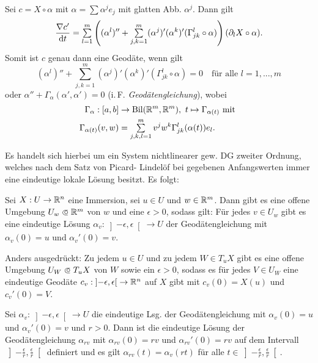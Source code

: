 \documentclass{cheat-sheet}
\newcommand{\Bil}{\mathrm{Bil}}
\newcommand{\ointervall}[1]{\left]#1\right[} %
\begin{document}
\begin{bem}
  Sei $c = X \circ \alpha$ mit $\alpha = \sum \alpha^j e_j$ mit glatten Abb. $\alpha^j$. Dann gilt
  \[ \frac{\nabla c'}{\d t} = \sum_{l=1}^m \left( (\alpha^l)'' + \sum_{j,k=1}^m (\alpha^j)' (\alpha^k)' (\Gamma_{jk}^l \circ \alpha) \right) (\partial_l X \circ \alpha). \]
  Somit ist $c$ genau dann eine Geodäte, wenn gilt
  \[ (\alpha^l)'' + \sum_{j,k=1}^m (\alpha^j)' (\alpha^k)' (\Gamma_{jk}^l \circ \alpha) = 0 \quad \text{für alle $l = 1, ..., m$} \]
  oder $\alpha'' + \Gamma_{\alpha}(\alpha', \alpha') = 0$ (i.\,F. \emph{Geodätengleichung}), wobei
  \begin{align*}
    \Gamma_{\alpha} : [a, b] &\to \Bil(\R^m, \R^m), \  t \mapsto \Gamma_{\alpha(t)} \text{ mit }\\
    \Gamma_{\alpha(t)}(v, w) &= \sum_{j,k,l=1}^m v^j w^k \Gamma_{jk}^l (\alpha(t)) e_l.
  \end{align*}
\end{bem}

\begin{bem}
  Es handelt sich hierbei um ein System nichtlinearer gew. DG zweiter Ordnung, welches nach dem Satz von Picard- Lindelöf bei gegebenen Anfangswerten immer eine eindeutige lokale Lösung besitzt. Es folgt:
\end{bem}

\begin{satz}
  Sei $X : U \to \mathbb{R}^n$ eine Immersion, sei $u \in U$ und $w \in \mathbb{R}^m$. Dann gibt es eine offene Umgebung $U_w \opn \R^m$ von $w$ und eine $\epsilon > 0$, sodass gilt: Für jedes $v \in U_w$ gibt es eine eindeutige Lösung $\alpha_v : \ointervall{-\epsilon, \epsilon} \to U$ der Geodätengleichung mit $\alpha_v(0) = u$ und $\alpha_v'(0) = v$.

  Anders ausgedrückt: Zu jedem $u \in U$ und zu jedem $W \in T_u X$ gibt es eine offene Umgebung $U_W \opn T_u X$ von $W$ sowie ein $\epsilon > 0$, sodass es für jedes $V \in U_W$ eine eindeutige Geodäte $c_v : \ointervall{-\epsilon, \epsilon} \to \R^n$ auf $X$ gibt mit $c_v(0) = X(u)$ und $c_v'(0) = V$.
\end{satz}

\begin{satz}
  Sei $\alpha_v : \ointervall{-\epsilon, \epsilon} \to U$ die eindeutige Lsg. der Geodätengleichung mit $\alpha_v(0) = u$ und $\alpha_v'(0) = v$ und $r > 0$. Dann ist die eindeutige Lösung der Geodätengleichung $\alpha_{rv}$ mit $\alpha_{rv}(0) = rv$ und $\alpha_{rv}'(0) = rv$ auf dem Intervall $\ointervall{-\tfrac{\epsilon}{r}, \tfrac{\epsilon}{r}}$ definiert und es gilt
  $\alpha_{rv}(t) = \alpha_v(rt)$ für alle $t \in \ointervall{-\tfrac{\epsilon}{r}, \tfrac{\epsilon}{r}}$.
\end{satz}
\end{document}
